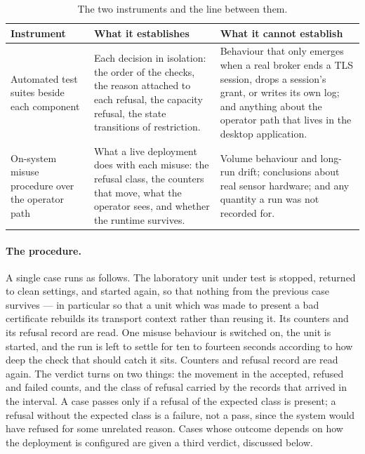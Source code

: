 \documentclass[12pt,a4paper]{report}
\begin{document}
\begin{table}[htbp]
\centering
{\small
\begin{tabularx}{\textwidth}{@{}p{3.4cm}p{5.6cm}Y@{}}
\toprule
\textbf{Instrument} & \textbf{What it establishes} & \textbf{What it cannot establish} \\
\midrule
Automated test suites beside each component
& Each decision in isolation: the order of the checks,
the reason attached to each refusal, the capacity
refusal, the state transitions of restriction.
& Behaviour that only emerges when a real broker ends a
TLS session, drops a session's grant, or writes its own
log; and anything about the operator path that lives in
the desktop application. \\
\midrule
On-system misuse procedure over the operator path
& What a live deployment does with each misuse: the
refusal class, the counters that move, what the operator
sees, and whether the runtime survives.
& Volume behaviour and long-run drift; conclusions about
real sensor hardware; and any quantity a run was not
recorded for. \\
\bottomrule
\end{tabularx}}
\caption{The two instruments and the line between them.}
\label{tab:eval-instruments}
\end{table}

\paragraph{The procedure.}
A single case runs as follows. The laboratory unit under
test is stopped, returned to clean settings, and started
again, so that nothing from the previous case survives ---
in particular so that a unit which was made to present a
bad certificate rebuilds its transport context rather than
reusing it. Its counters and its refusal record are read.
One misuse behaviour is switched on, the unit is started,
and the run is left to settle for ten to fourteen seconds
according to how deep the check that should catch it sits.
Counters and refusal record are read again. The verdict
turns on two things: the movement in the accepted, refused
and failed counts, and the class of refusal carried by the
records that arrived in the interval. A case passes only if
a refusal of the expected class is present; a refusal
without the expected class is a failure, not a pass, since
the system would have refused for some unrelated reason.
Cases whose outcome depends on how the deployment is
configured are given a third verdict, discussed below.
\end{document}
